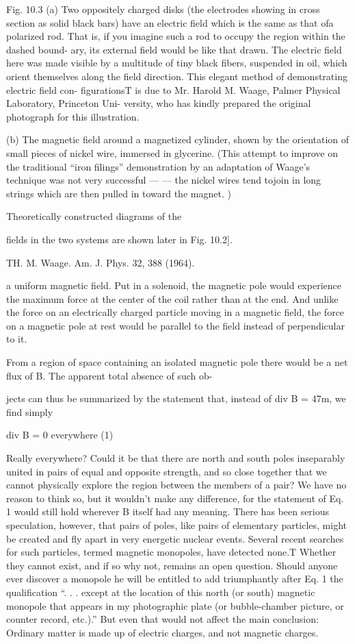 {%
Fig. 10.3 (a) Two oppositely charged
disks (the electrodes showing in cross section
as solid black bars) have an electric
field which is the same as that ofa polarized
rod. That is, if you imagine such a rod to
occupy the region within the dashed bound-
ary, its external field would be like that
drawn. The electric field here was made
visible by a multitude of tiny black fibers,
suspended in oil, which orient themselves
along the field direction. This elegant
method of demonstrating electric field con-
figurationsT is due to Mr. Harold M. Waage,
Palmer Physical Laboratory, Princeton Uni-
versity, who has kindly prepared the original
photograph for this illustration.

(b) The magnetic field around a magnetized
cylinder, shown by the orientation
of small pieces of nickel wire, immersed in
glycerine. (This attempt to improve on
the traditional ``iron filings'' demonstration
by an adaptation of Waage's technique was
not very successful ---  --- the nickel wires tend
tojoin in long strings which are then pulled
in toward the magnet. )

Theoretically constructed diagrams of the

fields in the two systems are shown later in
Fig. 10.2].

TH. M. Waage. Am. J. Phys. 32, 388 (1964).

a uniform magnetic field. Put in a solenoid, the magnetic pole would
experience the maximum force at the center of the coil rather than
at the end. And unlike the force on an electrically charged particle
moving in a magnetic field, the force on a magnetic pole at rest would
be parallel to the field instead of perpendicular to it.

From a region of space containing an isolated magnetic pole there
would be a net flux of B. The apparent total absence of such ob-

jects can thus be summarized by the statement that, instead of
div B = 47m, we find simply

div B = 0 everywhere (1)

Really everywhere? Could it be that there are north and south
poles inseparably united in pairs of equal and opposite strength, and
so close together that we cannot physically explore the region between
the members of a pair? We have no reason to think so, but
it wouldn't make any difference, for the statement of Eq. 1 would
still hold wherever B itself had any meaning. There has been serious
speculation, however, that pairs of poles, like pairs of elementary
particles, might be created and fly apart in very energetic nuclear
events. Several recent searches for such particles, termed magnetic
monopoles, have detected none.T Whether they cannot exist, and
if so why not, remains an open question. Should anyone ever discover
a monopole he will be entitled to add triumphantly after Eq. 1
the qualification ``. . . except at the location of this north (or south)
magnetic monopole that appears in my photographic plate (or
bubble-chamber picture, or counter record, etc.).'' But even that
would not affect the main conclusion: Ordinary matter is made up
of electric charges, and not magnetic charges.

}
